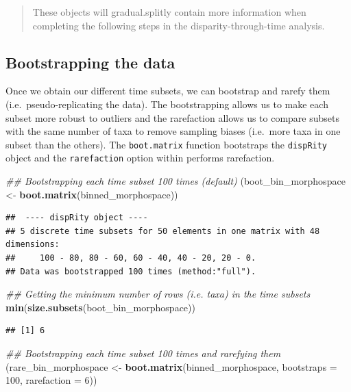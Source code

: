 \documentclass[]{book}
\newenvironment{Shaded}{\begin{snugshade}}{\end{snugshade}}
\newcommand{\CommentTok}[1]{\textcolor[rgb]{0.56,0.35,0.01}{\textit{#1}}}
\newcommand{\DataTypeTok}[1]{\textcolor[rgb]{0.13,0.29,0.53}{#1}}
\newcommand{\DecValTok}[1]{\textcolor[rgb]{0.00,0.00,0.81}{#1}}
\newcommand{\KeywordTok}[1]{\textcolor[rgb]{0.13,0.29,0.53}{\textbf{#1}}}
\newcommand{\NormalTok}[1]{#1}
\newcommand{\StringTok}[1]{\textcolor[rgb]{0.31,0.60,0.02}{#1}}
\begin{document}
\begin{quote}
These objects will gradual.splitly contain more information when completing the following steps in the disparity-through-time analysis.
\end{quote}

\hypertarget{bootstrapping-the-data-1}{%
\subsection{Bootstrapping the data}\label{bootstrapping-the-data-1}}

Once we obtain our different time subsets, we can bootstrap and rarefy them (i.e.~pseudo-replicating the data).
The bootstrapping allows us to make each subset more robust to outliers and the rarefaction allows us to compare subsets with the same number of taxa to remove sampling biases (i.e.~more taxa in one subset than the others).
The \texttt{boot.matrix} function bootstraps the \texttt{dispRity} object and the \texttt{rarefaction} option within performs rarefaction.

\begin{Shaded}
\begin{Highlighting}[]
\CommentTok{## Bootstrapping each time subset 100 times (default)}
\NormalTok{(boot_bin_morphospace <-}\StringTok{ }\KeywordTok{boot.matrix}\NormalTok{(binned_morphospace))}
\end{Highlighting}
\end{Shaded}

\begin{verbatim}
##  ---- dispRity object ---- 
## 5 discrete time subsets for 50 elements in one matrix with 48 dimensions:
##     100 - 80, 80 - 60, 60 - 40, 40 - 20, 20 - 0.
## Data was bootstrapped 100 times (method:"full").
\end{verbatim}

\begin{Shaded}
\begin{Highlighting}[]
\CommentTok{## Getting the minimum number of rows (i.e. taxa) in the time subsets}
\KeywordTok{min}\NormalTok{(}\KeywordTok{size.subsets}\NormalTok{(boot_bin_morphospace))}
\end{Highlighting}
\end{Shaded}

\begin{verbatim}
## [1] 6
\end{verbatim}

\begin{Shaded}
\begin{Highlighting}[]
\CommentTok{## Bootstrapping each time subset 100 times and rarefying them }
\NormalTok{(rare_bin_morphospace <-}\StringTok{ }\KeywordTok{boot.matrix}\NormalTok{(binned_morphospace, }\DataTypeTok{bootstraps =} \DecValTok{100}\NormalTok{,}
    \DataTypeTok{rarefaction =} \DecValTok{6}\NormalTok{))}
\end{Highlighting}
\end{Shaded}
\end{document}

